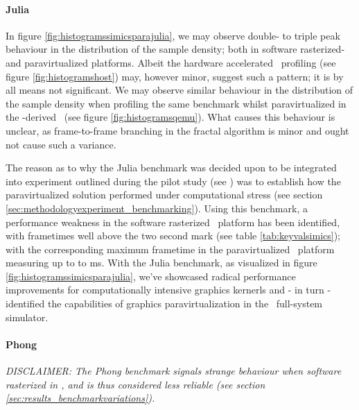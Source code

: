 \paragraph{Julia}
\label{par:results_julia}
In figure \ref{fig:histogramssimicsparajulia}, we may observe double- to triple peak behaviour in the distribution of the sample density; both in software rasterized- and paravirtualized platforms.
Albeit the hardware accelerated \dvttermhost\ profiling (see figure \ref{fig:histogramshost}) may, however minor, suggest such a pattern; it is by all means not significant.
We may observe similar behaviour in the distribution of the sample density when profiling the same benchmark whilst paravirtualized in the \dvttermqemu -derived \dvttermandroidemulator\ (see figure \ref{fig:histogramsqemu}).
What causes this behaviour is unclear, as frame-to-frame branching in the fractal algorithm is minor and ought not cause such a variance.

The reason as to why the Julia benchmark was decided upon to be integrated into experiment outlined during the pilot study (see ) was to establish how the paravirtualized solution performed under computational stress (see section \ref{sec:methodologyexperiment_benchmarking}).
Using this benchmark, a performance weakness in the software rasterized \dvttermsimics\ platform has been identified, with frametimes well above the two second mark (see table \ref{tab:keyvalsimics}); with the corresponding maximum frametime in the paravirtualized \dvttermsimics\ platform measuring up to to  ms.
With the Julia benchmark, as visualized in figure \ref{fig:histogramssimicsparajulia}, we've showcased radical performance improvements for computationally intensive graphics kernerls and - in turn - identified the capabilities of graphics paravirtualization in the \dvttermsimics\ full-system simulator. %




\paragraph{Phong}
\label{par:results_phong}
\textit{DISCLAIMER: The Phong benchmark signals strange behaviour when software rasterized in \dvttermsimics , and is thus considered less reliable (see section \ref{sec:results_benchmarkvariations}).}\\

